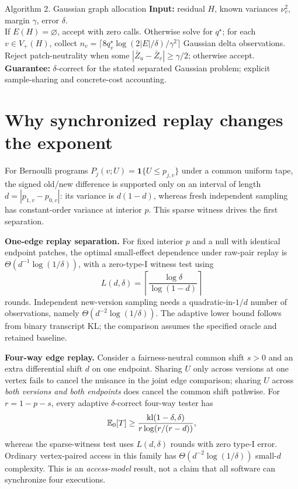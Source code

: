 \begin{researchalgorithm}{Algorithm 2. Gaussian graph allocation}\label{alg:gaussian}
\textbf{Input:} residual $H$, known variances $\nu_v^2$, margin $\gamma$, error $\delta$.\\
If $E(H)=\varnothing$, accept with zero calls. Otherwise solve  for $q^\star$; for each $v\in V_+(H)$, collect $n_v=\lceil8q_v^\star\log(2|E|/\delta)/\gamma^2\rceil$ Gaussian delta observations. Reject patch-neutrality when some $|\bar Z_u-\bar Z_v|\ge\gamma/2$; otherwise accept.\\
\textbf{Guarantee:} $\delta$-correct for the stated separated Gaussian problem; explicit sample-sharing and concrete-cost accounting.
\end{researchalgorithm}

\section{Why synchronized replay changes the exponent}
For Bernoulli programs $P_j(v;U)=\mathbf 1\{U\le p_{j,v}\}$ under a common uniform tape, the signed old/new difference is supported only on an interval of length $d=|p_{1,v}-p_{0,v}|$: its variance is $d(1-d)$, whereas fresh independent sampling has constant-order variance at interior $p$. This sparse witness drives the first separation.

\textbf{One-edge replay separation.} For fixed interior $p$ and a null with identical endpoint patches, the optimal small-effect dependence under raw-pair replay is $\Theta(d^{-1}\log(1/\delta))$, with a zero-type-I witness test using
\begin{equation}\label{eq:pair-steps}
L(d,\delta)=\left\lceil\frac{\log\delta}{\log(1-d)}\right\rceil
\end{equation}
rounds. Independent new-version sampling needs a quadratic-in-$1/d$ number of observations, namely $\Theta(d^{-2}\log(1/\delta))$. The adaptive lower bound follows from binary transcript KL; the comparison assumes the specified oracle and retained baseline.

\textbf{Four-way edge replay.} Consider a fairness-neutral common shift $s>0$ and an extra differential shift $d$ on one endpoint. Sharing $U$ only across versions at one vertex fails to cancel the nuisance in the joint edge comparison; sharing $U$ across \emph{both versions and both endpoints} does cancel the common shift pathwise. For $r=1-p-s$, every adaptive $\delta$-correct four-way tester has
\begin{equation}\label{eq:four-kl}
\mathbb{E}_0[T]\ge\frac{\mathrm{kl}(1-\delta,\delta)}{r\log(r/(r-d))},
\end{equation}
whereas the sparse-witness test uses $L(d,\delta)$ rounds with zero type-I error. Ordinary vertex-paired access in this family has $\Theta(d^{-2}\log(1/\delta))$ small-$d$ complexity. This is an \emph{access-model} result, not a claim that all software can synchronize four executions.

